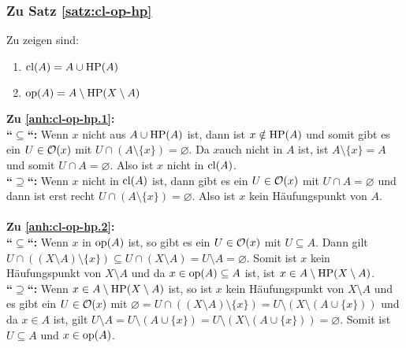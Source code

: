     
\subsubsection{Zu Satz \ref{satz:cl-op-hp}}\label{anh:cl-op-hp}
    Zu zeigen sind:
    \begin{enumerate}
        \item \label{anh:cl-op-hp.1} $\text{cl}(A) = A \cup \text{HP}(A)$
        \item \label{anh:cl-op-hp.2} $\text{op}(A) = A \setminus \text{HP}(X \setminus A)$
    \end{enumerate}
    
    \noindent
    \textbf{Zu \ref{anh:cl-op-hp.1}: }\\
    \textbf{``$\boldsymbol{\subseteq}$``:}
        Wenn $x$ nicht aus $A \cup \text{HP}(A)$ ist, dann ist $x \notin \text{HP}(A)$ und somit gibt es ein $U \in \mathcal{O}(x)$ mit $U \cap (A \setminus \{x\}) = \varnothing$.
        Da $x$auch nicht in $A$ ist, ist $A \setminus \{x\} = A$ und somit $U \cap A = \varnothing$. Also ist $x$ nicht in $\text{cl}(A)$.\\
    \textbf{``$\boldsymbol{\supseteq}$``:}
        Wenn $x$ nicht in $\text{cl}(A)$ ist, dann gibt es ein $U \in \mathcal{O}(x)$ mit $U \cap A = \varnothing$ und dann ist erst recht $U \cap (A \setminus \{x\}) = \varnothing$. Also ist $x$ kein Häufungspunkt von $A$.\\ \ \\
    
    \noindent
    \textbf{Zu \ref{anh:cl-op-hp.2}: }\\
    \textbf{``$\boldsymbol{\subseteq}$``:}
        Wenn $x$ in $\text{op}(A)$ ist, so gibt es ein $U \in \mathcal{O}(x)$ mit $U \subseteq A$.
        Dann gilt $U \cap ((X \setminus A) \setminus \{x\}) \subseteq U \cap (X \setminus A) = U \setminus A = \varnothing$.
        Somit ist $x$ kein Häufungspunkt von $X \setminus A$ und da $x \in \text{op}(A) \subseteq A$ ist, ist $x \in A \setminus \text{HP}(X \setminus A)$.\\
    \textbf{``$\boldsymbol{\supseteq}$``:}
        Wenn $x \in A \setminus \text{HP}(X \setminus A)$ ist, so ist $x$ kein Häufungspunkt von $X \setminus A$ und es gibt ein $U \in \mathcal{O}(x)$ mit $\varnothing = U \cap ((X \setminus A) \setminus \{x\}) = U \setminus (X \setminus (A \cup \{x\}))$ und da $x \in A$ ist, gilt $U \setminus A = U \setminus (A \cup \{x\}) = U \setminus (X \setminus (A \cup \{x\})) = \varnothing$. Somit ist $U \subseteq A$ und $x \in \text{op}(A)$.

